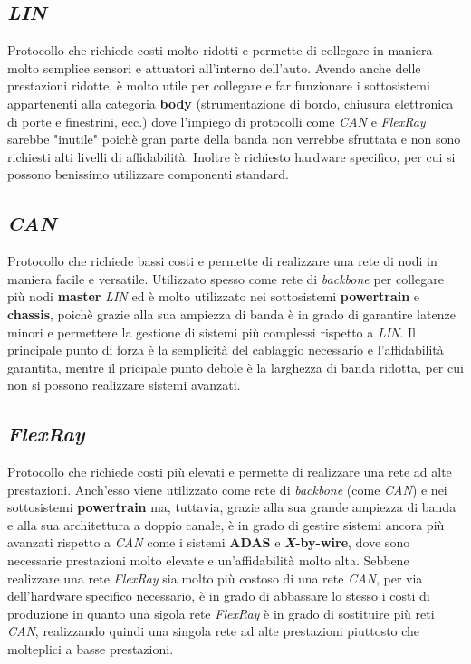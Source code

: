 \subsection{\emph{LIN}}
Protocollo che richiede costi molto ridotti e permette di collegare in maniera molto semplice sensori e attuatori all'interno dell'auto. Avendo anche delle prestazioni ridotte, è molto utile per collegare e far funzionare i sottosistemi appartenenti alla categoria \textbf{body} (strumentazione di bordo, chiusura elettronica di porte e finestrini, ecc.) dove l'impiego di protocolli come \emph{CAN} e \emph{FlexRay} sarebbe "inutile" poichè gran parte della banda non verrebbe sfruttata e non sono richiesti alti livelli di affidabilità. Inoltre è richiesto hardware specifico, per cui si possono benissimo utilizzare componenti standard. \cite{huang_2019_invehicle}

\subsection{\emph{CAN}}
Protocollo che richiede bassi costi e permette di realizzare una rete di nodi in maniera facile e versatile. Utilizzato spesso come rete di \emph{backbone} per collegare più nodi \textbf{master} \emph{LIN} ed è molto utilizzato nei sottosistemi \textbf{powertrain} e \textbf{chassis}, poichè grazie alla sua ampiezza di banda è in grado di garantire latenze minori e permettere la gestione di sistemi più complessi rispetto a \emph{LIN}. Il principale punto di forza è la semplicità del cablaggio necessario e l'affidabilità garantita, mentre il pricipale punto debole è la larghezza di banda ridotta, per cui non si possono realizzare sistemi avanzati. \cite{huang_2019_invehicle}
\subsection{\emph{FlexRay}}
Protocollo che richiede costi più elevati e permette di realizzare una rete ad alte prestazioni. Anch'esso viene utilizzato come rete di \emph{backbone} (come \emph{CAN}) e nei sottosistemi \textbf{powertrain} ma, tuttavia, grazie alla sua grande ampiezza di banda e alla sua architettura a doppio canale, è in grado di gestire sistemi ancora più avanzati rispetto a \emph{CAN} come i sistemi \textbf{ADAS} e \textbf{\emph{X}-by-wire}, dove sono necessarie prestazioni molto elevate e un'affidabilità molto alta. Sebbene realizzare una rete \emph{FlexRay} sia molto più costoso di una rete \emph{CAN}, per via dell'hardware specifico necessario, è in grado di abbassare lo stesso i costi di produzione in quanto una sigola rete \emph{FlexRay} è in grado di sostituire più reti \emph{CAN}, realizzando quindi una singola rete ad alte prestazioni piuttosto che molteplici a basse prestazioni. \cite{huang_2019_invehicle}

